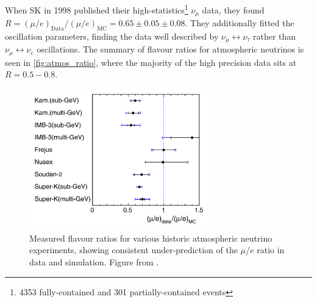 When SK in 1998 published\cite{sk_disc} their high-statistics\footnote{4353 fully-contained and 301 partially-contained events} $\nu_\mu$ data, they found $R=\left( \mu/e \right)_\text{Data}/\left( \mu/e \right)_\text{MC} =0.65\pm0.05\pm0.08$. They additionally fitted the oscillation parameters, finding the data well described by $\nu_\mu \leftrightarrow \nu_\tau$ rather than $\nu_\mu \leftrightarrow \nu_e$ oscillations. The summary of flavour ratios for atmospheric neutrinos is seen in \autoref{fig:atmos_ratio}, where the majority of the high precision data sits at $R=0.5-0.8$.
\begin{figure}[h]
	\includegraphics[width=0.7\textwidth, trim={0mm 0mm 0mm 0mm}, clip,page=1]{figures/theory/flavour_ratio}
	\caption{Measured flavour ratios for various historic atmospheric neutrino experiments, showing consistent under-prediction of the $\mu/e$ ratio in data and simulation. Figure from \cite{kajita_summary}.}
	\label{fig:atmos_ratio}
\end{figure}

